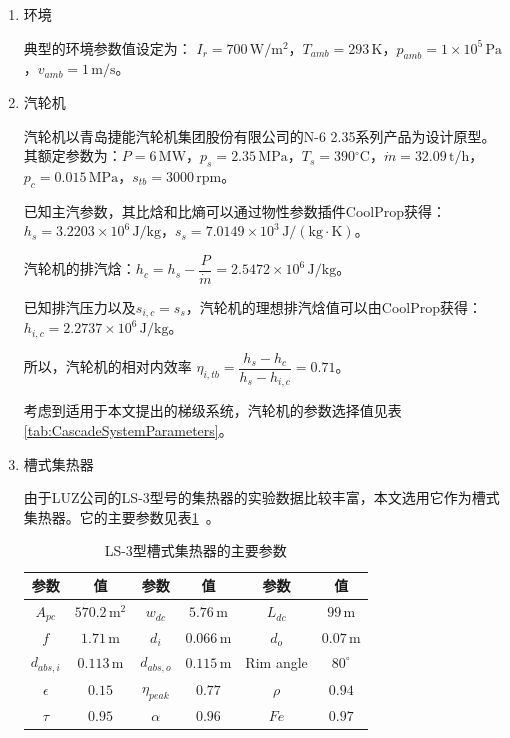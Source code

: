 \begin{enumerate}[label=(\arabic*)]

\item 环境

\setlength\parindent{2em}典型的环境参数值设定为：
$I_r = 700\,\mathrm{W/m^2}$，$T_{amb} = 293\,\mathrm{K}$，$p_{amb} = 1\times10^5\,\mathrm{Pa}$，$v_{amb} = 1\,\mathrm{m/s}$。

\item 汽轮机

汽轮机以青岛捷能汽轮机集团股份有限公司的N-6 2.35系列产品为设计原型。其额定参数为：$P = 6\,\mathrm{MW}$，$p_s = 2.35\,\mathrm{MPa}$，$T_s = 390\mathrm{^\circ C}$，$\dot{m} = 32.09\,\mathrm{t/h}$，$p_c = 0.015\,\mathrm{MPa}$，$s_{tb} = 3000\,\mathrm{rpm}$。
	
	已知主汽参数，其比焓和比熵可以通过物性参数插件CoolProp获得：$h_s = 3.2203\times10^6\,\mathrm{J/kg}$，$s_s = 7.0149\times10^3\,\mathrm{J/(kg\cdot K)}$。
	
	汽轮机的排汽焓：$h_{c} = h_{s} - \dfrac{P}{\dot{m}} = 2.5472\times10^6\,\mathrm{J/kg}$。
	
	已知排汽压力以及$s_{i,c} = s_s$，汽轮机的理想排汽焓值可以由CoolProp获得：$h_{i,c} = 2.2737\times10^6\,\mathrm{J/kg}$。
	
	所以，汽轮机的相对内效率
	$\eta_{i,tb} = \dfrac{h_s - h_c}{h_{s} - h_{i,c}} = 0.71$。
	
	考虑到适用于本文提出的梯级系统，汽轮机的参数选择值见表\ref{tab:CascadeSystemParameters}。
		 
\item 槽式集热器

由于LUZ公司的LS-3型号的集热器的实验数据比较丰富，本文选用它作为槽式集热器。它的主要参数见表\ref{tab:TroughParameters}~\cite{Fernandez2010}。

\begin{table}[htbp]
\setlength{\abovecaptionskip}{-10pt}
	\caption{LS-3型槽式集热器的主要参数}
	\begin{center}
	\begin{tabular}{cccccc}
		\toprule
		参数		&	值	&	参数		&	值	&	参数		&	值\\
		\midrule
		$A_{pc}$		&	$570.2\,\mathrm{m^2}$	&	$w_{dc}$	&	$5.76\,\mathrm{m}$	&	$L_{dc}$	&	$99\,\mathrm{m}$\\
		$f$	&	$1.71\,\mathrm{m}$	&	$d_i$		&	$0.066\,\mathrm{m}$	&	$d_o$	&	$0.07\,\mathrm{m}$\\
		$d_{abs,i}$	&	$0.113\,\mathrm{m}$	&	$d_{abs,o}$	&	$0.115\,\mathrm{m}$	&	Rim angle	&	$80^\circ$\\
		$\epsilon$		&	$0.15$	&	$\eta_{peak}$	&	$0.77$	&	$\rho$	&	$0.94$\\
		$\tau$	&	$0.95$	&	
$\alpha$	&	$0.96$	&	$Fe$	&	$0.97$\\
		\bottomrule
	\end{tabular}
	\end{center}
	\label{tab:TroughParameters}
\end{table}


\end{enumerate}
